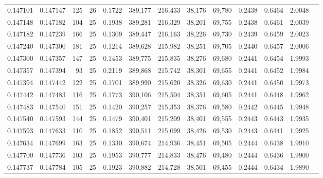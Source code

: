\begin{tabular}{rrrrrrrrrrrrr}
0.147101 & 0.147147 &   125 &  26 &                                     0.1722 & 389,177 & 216,433 &  38,176 &  69,780 & 0.2438 & 0.6464 & 2.0048 \\
0.147148 & 0.147182 &   104 &  25 &                                     0.1938 & 389,281 & 216,329 &  38,201 &  69,755 & 0.2438 & 0.6461 & 2.0039 \\
0.147182 & 0.147239 &   166 &  25 &                                     0.1309 & 389,447 & 216,163 &  38,226 &  69,730 & 0.2439 & 0.6459 & 2.0023 \\
0.147240 & 0.147300 &   181 &  25 &                                     0.1214 & 389,628 & 215,982 &  38,251 &  69,705 & 0.2440 & 0.6457 & 2.0006 \\
0.147300 & 0.147357 &   147 &  25 &                                     0.1453 & 389,775 & 215,835 &  38,276 &  69,680 & 0.2441 & 0.6454 & 1.9993 \\
0.147357 & 0.147394 &    93 &  25 &                                     0.2119 & 389,868 & 215,742 &  38,301 &  69,655 & 0.2441 & 0.6452 & 1.9984 \\
0.147394 & 0.147442 &   122 &  25 &                                     0.1701 & 389,990 & 215,620 &  38,326 &  69,630 & 0.2441 & 0.6450 & 1.9973 \\
0.147442 & 0.147483 &   116 &  25 &                                     0.1773 & 390,106 & 215,504 &  38,351 &  69,605 & 0.2441 & 0.6448 & 1.9962 \\
0.147483 & 0.147540 &   151 &  25 &                                     0.1420 & 390,257 & 215,353 &  38,376 &  69,580 & 0.2442 & 0.6445 & 1.9948 \\
0.147540 & 0.147593 &   144 &  25 &                                     0.1479 & 390,401 & 215,209 &  38,401 &  69,555 & 0.2443 & 0.6443 & 1.9935 \\
0.147593 & 0.147633 &   110 &  25 &                                     0.1852 & 390,511 & 215,099 &  38,426 &  69,530 & 0.2443 & 0.6441 & 1.9925 \\
0.147634 & 0.147699 &   163 &  25 &                                     0.1330 & 390,674 & 214,936 &  38,451 &  69,505 & 0.2444 & 0.6438 & 1.9910 \\
0.147700 & 0.147736 &   103 &  25 &                                     0.1953 & 390,777 & 214,833 &  38,476 &  69,480 & 0.2444 & 0.6436 & 1.9900 \\
0.147737 & 0.147784 &   105 &  25 &                                     0.1923 & 390,882 & 214,728 &  38,501 &  69,455 & 0.2444 & 0.6434 & 1.9890 \\

\end{tabular}
